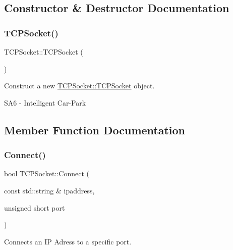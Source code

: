 \subsection{Constructor \& Destructor Documentation}
\mbox{\label{class_t_c_p_socket_a7a50427a401d1a6f3209d51818bad901}} 
\subsubsection{\texorpdfstring{T\+C\+P\+Socket()}{TCPSocket()}}
{\footnotesize\ttfamily T\+C\+P\+Socket\+::\+T\+C\+P\+Socket (\begin{DoxyParamCaption}{ }\end{DoxyParamCaption})}



Construct a new \mbox{\hyperlink{class_t_c_p_socket_a7a50427a401d1a6f3209d51818bad901}{T\+C\+P\+Socket\+::\+T\+C\+P\+Socket}} object. 

S\+A6 -\/ Intelligent Car-\/\+Park 

\subsection{Member Function Documentation}
\mbox{\label{class_t_c_p_socket_ac816c30175550d8d9a14c89c1c5ec8da}} 
\subsubsection{\texorpdfstring{Connect()}{Connect()}}
{\footnotesize\ttfamily bool T\+C\+P\+Socket\+::\+Connect (\begin{DoxyParamCaption}\item[{const std\+::string \&}]{ipaddress,  }\item[{unsigned short}]{port }\end{DoxyParamCaption})}



Connects an IP Adress to a specific port. 


